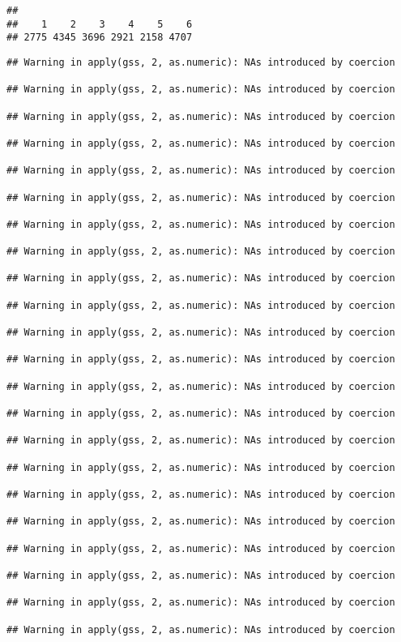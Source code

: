 \documentclass[
]{article}
\begin{document}
\begin{verbatim}
## 
##    1    2    3    4    5    6 
## 2775 4345 3696 2921 2158 4707
\end{verbatim}

\begin{verbatim}
## Warning in apply(gss, 2, as.numeric): NAs introduced by coercion

## Warning in apply(gss, 2, as.numeric): NAs introduced by coercion

## Warning in apply(gss, 2, as.numeric): NAs introduced by coercion

## Warning in apply(gss, 2, as.numeric): NAs introduced by coercion

## Warning in apply(gss, 2, as.numeric): NAs introduced by coercion

## Warning in apply(gss, 2, as.numeric): NAs introduced by coercion

## Warning in apply(gss, 2, as.numeric): NAs introduced by coercion

## Warning in apply(gss, 2, as.numeric): NAs introduced by coercion

## Warning in apply(gss, 2, as.numeric): NAs introduced by coercion

## Warning in apply(gss, 2, as.numeric): NAs introduced by coercion

## Warning in apply(gss, 2, as.numeric): NAs introduced by coercion

## Warning in apply(gss, 2, as.numeric): NAs introduced by coercion

## Warning in apply(gss, 2, as.numeric): NAs introduced by coercion

## Warning in apply(gss, 2, as.numeric): NAs introduced by coercion

## Warning in apply(gss, 2, as.numeric): NAs introduced by coercion

## Warning in apply(gss, 2, as.numeric): NAs introduced by coercion

## Warning in apply(gss, 2, as.numeric): NAs introduced by coercion

## Warning in apply(gss, 2, as.numeric): NAs introduced by coercion

## Warning in apply(gss, 2, as.numeric): NAs introduced by coercion

## Warning in apply(gss, 2, as.numeric): NAs introduced by coercion

## Warning in apply(gss, 2, as.numeric): NAs introduced by coercion

## Warning in apply(gss, 2, as.numeric): NAs introduced by coercion


\end{verbatim}
\end{document}
